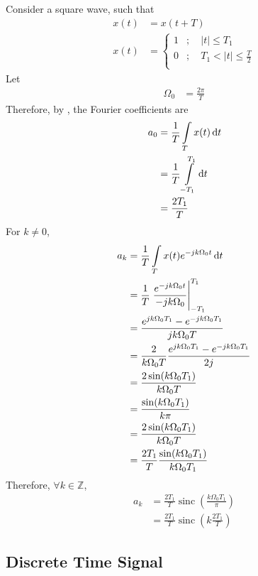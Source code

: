 \documentclass[titlepage, fleqn, a4paper, 12pt, twoside]{article}
\theoremstyle{definition}
\theoremstyle{theorem}
\DeclareMathOperator{\sinc}{sinc}
\begin{document}
Consider a square wave, such that
\begin{align*}
	x(t) &= x(t + T)\\
	x(t) &=
		\begin{cases}
			1 &;\quad |t| \le T_1\\
			0 &;\quad T_1 < |t| \le \frac{T}{2}\\
		\end{cases}
\end{align*}
Let
\begin{align*}
	\Omega_0 &= \frac{2 \pi}{T}
\end{align*}
Therefore, by , the Fourier coefficients are
\begin{align*}
	a_0 &= \frac{1}{T} \int\limits_{T} x(t) \dif t\\
	&= \frac{1}{T} \int\limits_{-T_1}^{T_1} \dif t\\
	&= \frac{2 T_1}{T}
\end{align*}
For $k \neq 0$,
\begin{align*}
	a_k &= \frac{1}{T} \int\limits_{T} x(t) e^{-j k \Omega_0 t} \dif t\\
	&= \frac{1}{T} \left. \frac{e^{-j k \Omega_0 t}}{-j k \Omega_0} \right|_{-T_1}^{T_1}\\
	&= \frac{e^{j k \Omega_0 T_1} - e^{-j k \Omega_0 T_1}}{j k \Omega_0 T}\\
	&= \frac{2}{k \Omega_0 T} \frac{e^{j k \Omega_0 T_1} - e^{-j k \Omega_0 T_1}}{2 j}\\
	&= \frac{2 \sin(k \Omega_0 T_1)}{k \Omega_0 T}\\
	&= \frac{\sin(k \Omega_0 T_1)}{k \pi}\\
	&= \frac{2 \sin(k \Omega_0 T_1)}{k \Omega_0 T}\\
	&= \frac{2 T_1}{T} \frac{\sin(k \Omega_0 T_1)}{k \Omega_0 T_1}
\end{align*}
Therefore, $\forall k \in \mathbb{Z}$,
\begin{align*}
	a_k &= \frac{2 T_1}{T} \sinc\left( \frac{k \Omega_0 T_1}{\pi} \right)\\
	&= \frac{2 T_1}{T} \sinc\left( k \frac{2 T_1}{T} \right)
\end{align*}

\subsection{Discrete Time Signal}
\end{document}
